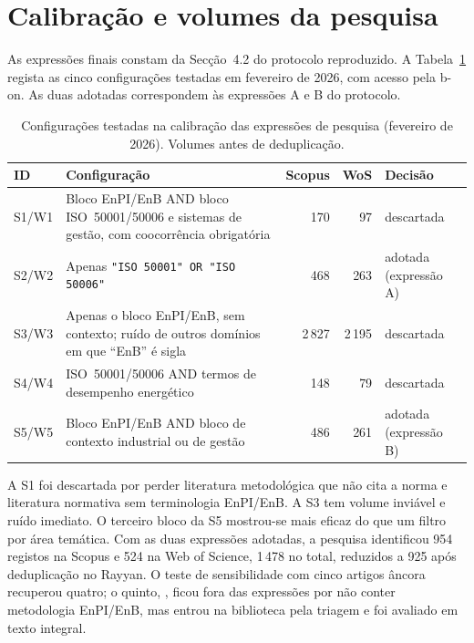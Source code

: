 \section{Calibração e volumes da pesquisa}
\label{sec:apA-pesquisa}

As expressões finais constam da Secção~4.2 do protocolo reproduzido. A Tabela~\ref{tab:apA-calibracao} regista as cinco configurações testadas em fevereiro de 2026, com acesso pela b-on. As duas adotadas correspondem às expressões A e B do protocolo.

\begin{table}[H]
\centering\small
\caption{Configurações testadas na calibração das expressões de pesquisa (fevereiro de 2026). Volumes antes de deduplicação.}
\label{tab:apA-calibracao}
\ntzebra
\begin{tabularx}{\linewidth}{@{}l>{\raggedright\arraybackslash}Xrrl@{}}
\toprule
\textbf{ID}  &  \textbf{Configuração}  &  \textbf{Scopus}  &  \textbf{WoS}  &  \textbf{Decisão} \\
\midrule
S1/W1 & Bloco EnPI/EnB AND bloco ISO~50001/50006 e sistemas de gestão, com coocorrência obrigatória & 170 & 97 & descartada \\
S2/W2 & Apenas \texttt{"ISO 50001" OR "ISO 50006"} & 468 & 263 & adotada (expressão A) \\
S3/W3 & Apenas o bloco EnPI/EnB, sem contexto; ruído de outros domínios em que ``EnB'' é sigla & 2\,827 & 2\,195 & descartada \\
S4/W4 & ISO~50001/50006 AND termos de desempenho energético & 148 & 79 & descartada \\
S5/W5 & Bloco EnPI/EnB AND bloco de contexto industrial ou de gestão & 486 & 261 & adotada (expressão B) \\
\bottomrule
\end{tabularx}
\end{table}

A S1 foi descartada por perder literatura metodológica que não cita a norma e literatura normativa sem terminologia EnPI/EnB. A S3 tem volume inviável e ruído imediato. O terceiro bloco da S5 mostrou-se mais eficaz do que um filtro por área temática. Com as duas expressões adotadas, a pesquisa identificou 954 registos na Scopus e 524 na Web of Science, 1\,478 no total, reduzidos a 925 após deduplicação no Rayyan. O teste de sensibilidade com cinco artigos âncora recuperou quatro; o quinto, \textcite{Karcher2015}, ficou fora das expressões por não conter metodologia EnPI/EnB, mas entrou na biblioteca pela triagem e foi avaliado em texto integral.

